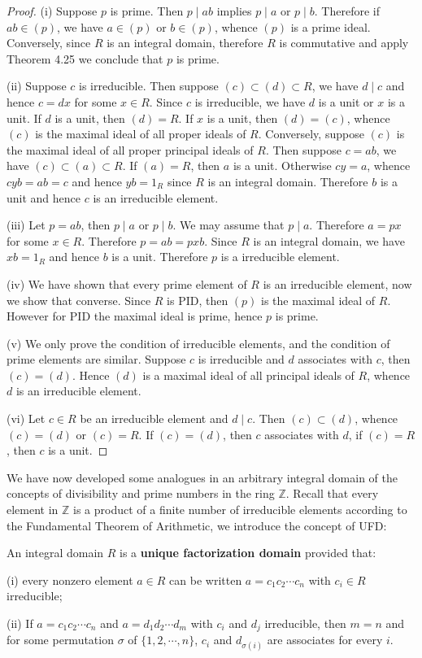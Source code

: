 \begin{proof}
(i) Suppose $p$ is prime. Then $p\mid ab$ implies $p\mid a$ or $p\mid b$. Therefore if $ab\in (p)$, we have $a\in (p)$ or $b\in (p)$, whence $(p)$ is a prime ideal. Conversely, since $R$ is an integral domain, therefore $R$ is commutative and apply Theorem 4.25 we conclude that $p$ is prime.\par
(ii) Suppose $c$ is irreducible. Then suppose $(c)\subset(d)\subset R$, we have $d\mid c$ and hence $c=dx$ for some $x\in R$. Since $c$ is irreducible, we have $d$ is a unit or $x$ is a unit. If $d$ is a unit, then $(d)=R$. If $x$ is a unit, then $(d)=(c)$, whence $(c)$ is the maximal ideal of all proper ideals of $R$. Conversely, suppose $(c)$ is the maximal ideal of all proper principal ideals of $R$. Then suppose $c=ab$, we have $(c)\subset(a)\subset R$. If $(a)=R$, then $a$ is a unit. Otherwise $cy=a$, whence $cyb=ab=c$ and hence $yb=1_R$ since $R$ is an integral domain. Therefore $b$ is a unit and hence $c$ is an irreducible element.\par
(iii) Let $p=ab$, then $p\mid a$ or $p\mid b$. We may assume that $p\mid a$. Therefore $a=px$ for some $x\in R$. Therefore $p=ab=pxb$. Since $R$ is an integral domain, we have $xb=1_R$ and hence $b$ is a unit. Therefore $p$ is a irreducible element.\par
(iv) We have shown that every prime element of $R$ is an irreducible element, now we show that converse. Since $R$ is PID, then $(p)$ is the maximal ideal of $R$. However for PID the maximal ideal is prime, hence $p$ is prime.\par
(v) We only prove the condition of irreducible elements, and the condition of prime elements are similar. Suppose $c$ is irreducible and $d$ associates with $c$, then $(c)=(d)$. Hence $(d)$ is a maximal ideal of all principal ideals of $R$, whence $d$ is an irreducible element.\par
(vi) Let $c\in R$ be an irreducible element and $d\mid c$. Then $(c)\subset (d)$, whence $(c)=(d)$ or $(c)=R$. If $(c)=(d)$, then $c$ associates with $d$, if $(c)=R$, then $c$ is a unit.
\end{proof}
We have now developed some analogues in an arbitrary integral domain of the concepts of divisibility and prime numbers in the ring $\mathbb{Z}$. Recall that every element in $\mathbb{Z}$ is a product of a finite number of irreducible elements according to the Fundamental Theorem of Arithmetic, we introduce the concept of UFD:
\begin{definition}
An integral domain $R$ is a \textbf{unique factorization domain} provided that:\par
(i) every nonzero element $a\in R$ can be written $a=c_1c_2\cdots c_n$ with $c_i\in R$ irreducible;\par
(ii) If $a=c_1c_2\cdots c_n$ and $a=d_1d_2\cdots d_m$ with $c_i$ and $d_j$ irreducible, then $m=n$ and for some permutation $\sigma$ of $\{1,2,\cdots,n\}$, $c_i$ and $d_{\sigma(i)}$ are associates for every $i$.
\end{definition}

